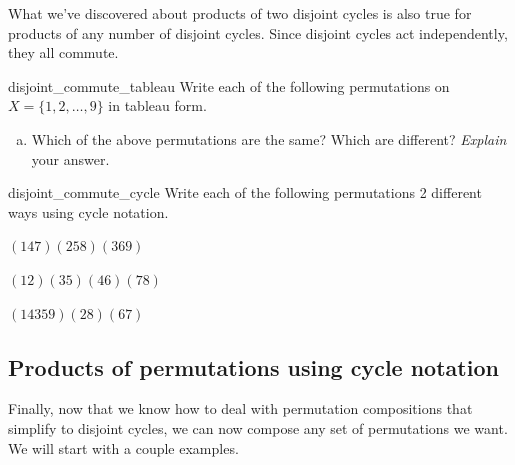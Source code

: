 \noindent
What we've discovered about products of two disjoint cycles is also true for products of any number of disjoint cycles. Since disjoint cycles act independently, they all commute.

\begin{exercise}{disjoint_commute_tableau}
Write each of the following permutations on $X = \{1,2,\ldots,9\}$ in tableau form.
\begin{enumerate}[(a)]
\item
Which of the above permutations are the same? Which are different? \emph{Explain} your answer.
\end{enumerate}
\end{exercise}

\begin{exercise}{disjoint_commute_cycle}
Write each of the following permutations 2 different ways using cycle notation.
\begin{enumerate}[(a)]
\begin{multicols}{3}
\item
$(147)(258)(369)$
\item
$(12)(35)(46)(78)$
\item
$(14359)(28)(67)$
\end{multicols}
\end{enumerate}
\end{exercise}


\subsection{Products of permutations using cycle notation}
Finally, now that we know how to deal with permutation compositions that simplify to disjoint cycles, we can now compose any set of permutations we want.  We will start with a couple examples.

